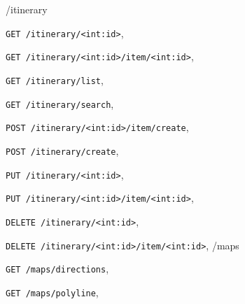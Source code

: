 \documentclass[letterpaper,10pt,english]{sphinxmanual}
\begin{document}
\renewcommand{\indexname}{HTTP Routing Table}
\begin{theindex}
\def\bigletter#1{{\Large\sffamily#1}\nopagebreak\vspace{1mm}}
\bigletter{/itinerary}
\item {\texttt{GET /itinerary/\textless{}int:id\textgreater{}}}, \pageref{apidoc:get--itinerary--int-id-}
\item {\texttt{GET /itinerary/\textless{}int:id\textgreater{}/item/\textless{}int:id\textgreater{}}}, \pageref{apidoc:get--itinerary--int-id--item--int-id-}
\item {\texttt{GET /itinerary/list}}, \pageref{apidoc:get--itinerary-list}
\item {\texttt{GET /itinerary/search}}, \pageref{apidoc:get--itinerary-search}
\item {\texttt{POST /itinerary/\textless{}int:id\textgreater{}/item/create}}, \pageref{apidoc:post--itinerary--int-id--item-create}
\item {\texttt{POST /itinerary/create}}, \pageref{apidoc:post--itinerary-create}
\item {\texttt{PUT /itinerary/\textless{}int:id\textgreater{}}}, \pageref{apidoc:put--itinerary--int-id-}
\item {\texttt{PUT /itinerary/\textless{}int:id\textgreater{}/item/\textless{}int:id\textgreater{}}}, \pageref{apidoc:put--itinerary--int-id--item--int-id-}
\item {\texttt{DELETE /itinerary/\textless{}int:id\textgreater{}}}, \pageref{apidoc:delete--itinerary--int-id-}
\item {\texttt{DELETE /itinerary/\textless{}int:id\textgreater{}/item/\textless{}int:id\textgreater{}}}, \pageref{apidoc:delete--itinerary--int-id--item--int-id-}
\indexspace
\bigletter{/maps}
\item {\texttt{GET /maps/directions}}, \pageref{apidoc:get--maps-directions}
\item {\texttt{GET /maps/polyline}}, \pageref{apidoc:get--maps-polyline}
\end{theindex}

\renewcommand{\indexname}{Index}
\printindex
\end{document}
